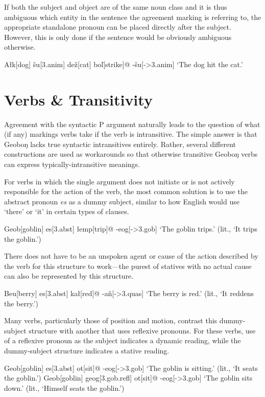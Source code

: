 \documentclass[a4paper,11pt,oneside,openany]{memoir}
\newcommand{\vz}{ž}
\newcommand{\vs}{š}
\newcommand{\vl}{ľ}
\newcommand{\vn}{ň}
\begin{document}
If both the subject and object are of the same noun class and it is thus ambiguous which entity in the sentence the agreement marking is referring to, the appropriate standalone pronoun can be placed directly after the subject. However, this is only done if the sentence would be obviously ambiguous otherwise.

\ex
\begingl
A\l k[dog]
\vs u[\sc 3.anim]
de{\vz}[cat]
bo\vl[strike]@
-\vs u[\sc ->3.anim]
\glft `The dog hit the cat.'
\endgl
\xe

\section{Verbs \& Transitivity}

Agreement with the syntactic P argument naturally leads to the question of what (if any) markings verbs take if the verb is intransitive. The simple answer is that Geoboŋ lacks true syntactic intransitives entirely. Rather, several different constructions are used as workarounds so that otherwise transitive Geoboŋ verbs can express typically-intransitive meanings.

For verbs in which the single argument does not initiate or is not actively responsible for the action of the verb, the most common solution is to use the abstract pronoun \textit{es} as a dummy subject, similar to how English would use `there' or `it' in certain types of clauses. 

\ex 
\begingl
Geob[goblin]
es[\sc 3.abst] 
\l emp[trip]@
-eog[\sc ->3.gob]
\glft `The goblin trips.' (lit., `It trips the goblin.')
\endgl
\xe

There does not have to be an unspoken agent or cause of the action described by the verb for this structure to work---the purest of statives with no actual cause can also be represented by this structure.

\ex
\begingl
Beu[berry]
es[\sc 3.abst]
ka\l[red]@
-a\vn[\sc ->3.quas]
\glft `The berry is red.' (lit., `It reddens the berry.')
\endgl
\xe

Many verbs, particularly those of position and motion, contrast this dummy-subject structure with another that uses reflexive pronouns. For these verbs, use of a reflexive pronoun as the subject indicates a dynamic reading, while the dummy-subject structure indicates a stative reading.

\pex
\a
\begingl
Geob[goblin]
es[\sc 3.abst]
ot[sit]@
-eog[\sc ->3.gob]
\glft `The goblin is sitting.' (lit., `It seats the goblin.')
\endgl
\a
\begingl
Geob[goblin]
geog[\sc 3.gob.refl]
ot[sit]@
-eog[\sc ->3.gob]
\glft `The goblin sits down.' (lit., `Himself seats the goblin.')
\endgl
\xe
\end{document}
